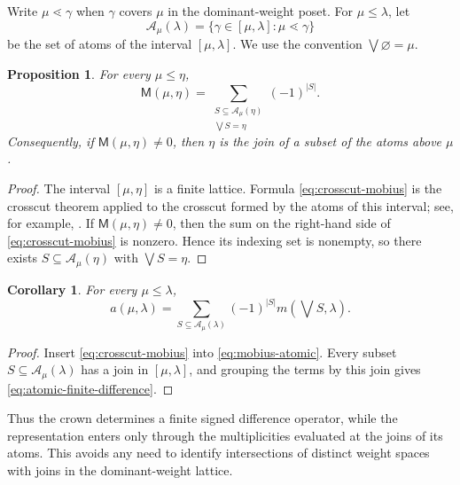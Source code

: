 \documentclass[11pt]{article}
\newtheorem{proposition}[proposition]{Proposition}
\newtheorem{corollary}[corollary]{Corollary}
\theoremstyle{definition}
\theoremstyle{remark}
\newcommand{\Mu}{\mathsf{M}}
\begin{document}
Write $\mu\lessdot\gamma$ when $\gamma$ covers $\mu$ in the dominant-weight
poset.  For $\mu\le\lambda$, let
\[
   \mathcal A_\mu(\lambda)
      =\{\gamma\in[\mu,\lambda]:\mu\lessdot\gamma\}
\]
be the set of atoms of the interval $[\mu,\lambda]$.  We use the convention
$\bigvee\varnothing=\mu$.

\begin{proposition}
\label{prop:crosscut-lower}
For every $\mu\le\eta$,
\begin{equation}\label{eq:crosscut-mobius}
   \Mu(\mu,\eta)
      =\sum_{\substack{S\subseteq\mathcal A_\mu(\eta)\\
                       \bigvee S=\eta}}
          (-1)^{|S|}.
\end{equation}
Consequently, if $\Mu(\mu,\eta)\ne0$, then $\eta$ is the join of a subset of
the atoms above $\mu$.
\end{proposition}

\begin{proof}
The interval $[\mu,\eta]$ is a finite lattice.  Formula
\eqref{eq:crosscut-mobius} is the crosscut theorem applied to the crosscut
formed by the atoms of this interval; see, for example,
\cite[Section~3.9]{StanleyEC1}.  If $\Mu(\mu,\eta)\ne0$, then the sum on the
right-hand side of \eqref{eq:crosscut-mobius} is nonzero.  Hence its indexing
set is nonempty, so there exists
$S\subseteq\mathcal A_\mu(\eta)$ with $\bigvee S=\eta$.
\end{proof}

\begin{corollary}
\label{cor:atomic-finite-difference}
For every $\mu\le\lambda$,
\begin{equation}\label{eq:atomic-finite-difference}
   a(\mu,\lambda)
      =\sum_{S\subseteq\mathcal A_\mu(\lambda)}
          (-1)^{|S|}
          m\!\left(\bigvee S,\lambda\right).
\end{equation}
\end{corollary}

\begin{proof}
Insert \eqref{eq:crosscut-mobius} into
\eqref{eq:mobius-atomic}.  Every subset $S\subseteq\mathcal A_\mu(\lambda)$
has a join in $[\mu,\lambda]$, and grouping the terms by this join gives
\eqref{eq:atomic-finite-difference}.
\end{proof}

Thus the crown determines a finite signed difference operator, while the
representation enters only through the multiplicities evaluated at the joins
of its atoms.  This avoids any need to identify intersections of distinct
weight spaces with joins in the dominant-weight lattice.
\end{document}
